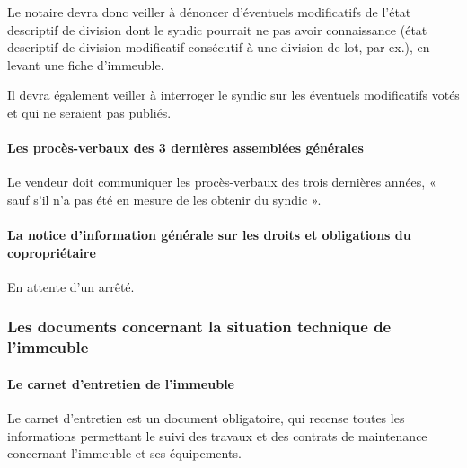 			Le notaire devra donc veiller à dénoncer d’éventuels modificatifs de l’état descriptif de division dont le
			syndic pourrait ne pas avoir connaissance (état descriptif de division modificatif consécutif à une division
			de lot, par ex.), en levant une fiche d’immeuble.

			Il devra également veiller à interroger le syndic sur les éventuels modificatifs votés et qui ne seraient pas
			publiés.
			
			\paragraph{Les procès-verbaux des 3 dernières assemblées générales}
			Le vendeur doit communiquer les procès-verbaux des trois dernières années, « sauf s’il n’a pas été en
			mesure de les obtenir du syndic ».
			
			\paragraph{La notice d’information générale sur les droits et obligations du copropriétaire}
			En attente d’un arrêté.
			
		\subsubsection{Les documents concernant la situation technique de l’immeuble}
		
			\paragraph{Le carnet d’entretien de l’immeuble}
			
			\par Le carnet d'entretien est un document obligatoire, qui recense toutes les informations
			permettant le suivi des travaux et des contrats de maintenance concernant l'immeuble et ses
			équipements.
			
